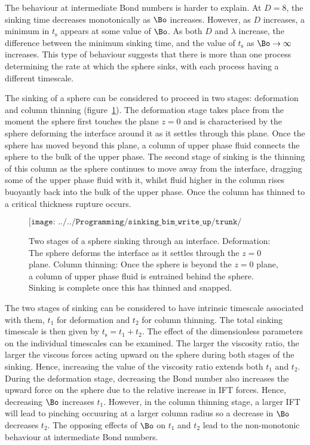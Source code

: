 {The behaviour at intermediate Bond numbers is harder to explain. At $D = 8$, the sinking time decreases monotonically as $\Bo$ increases. However, as $D$ increases, a minimum in $t_{\text{s}}$ appears at some value of $\Bo$. As both $D$ and $\lambda$ increase, the difference between the minimum sinking time, and the value of $t_{\text{s}}$ as $\Bo \to \infty$ increases. This type of behaviour suggests that there is more than one process determining the rate at which the sphere sinks, with each process having a different timescale.

The sinking of a sphere can be considered to proceed in two stages: deformation and column thinning (figure~\ref{fig:sink_stages}). The deformation stage takes place from the moment the sphere first touches the plane $z = 0$ and is characterised by the sphere deforming the interface around it as it settles through this plane. Once the sphere has moved beyond this plane, a column of upper phase fluid connects the sphere to the bulk of the upper phase. The second stage of sinking is the thinning of this column as the sphere continues to move away from the interface, dragging some of the upper phase fluid with it, whilst fluid higher in the column rises buoyantly back into the bulk of the upper phase. Once the column has thinned to a critical thickness rupture occurs. 

\begin{figure}
  $$\texttt{[image: ../../Programming/sinking\_bim\_write\_up/trunk/sink\_stages.png]}$$
  \caption{Two stages of a sphere sinking through an interface. Deformation: The sphere deforms the interface as it settles through the $z = 0$ plane. Column thinning: Once the sphere is beyond the $z = 0$ plane, a column of upper phase fluid is entrained behind the sphere. Sinking is complete once this has thinned and snapped. \label{fig:sink_stages}}
\end{figure}

The two stages of sinking can be considered to have intrinsic timescale associated with them, $t_{1}$ for deformation and $t_{2}$ for column thinning. The total sinking timescale is then given by $t_{\text{s}} = t_{1} + t_{2}$. The effect of the dimensionless parameters on the individual timescales can be examined. The larger the viscosity ratio, the larger the viscous forces acting upward on the sphere during both stages of the sinking. Hence, increasing the value of the viscosity ratio extends both $t_{1}$ and $t_{2}$. During the deformation stage, decreasing the Bond number also increases the upward force on the sphere due to the relative increase in IFT forces. Hence, decreasing $\Bo$ increases $t_{1}$. However, in the column thinning stage, a larger IFT will lead to pinching occuuring at a larger column radius so a decrease in $\Bo$ decreases $t_{2}$. The opposing effects of $\Bo$ on $t_{1}$ and $t_{2}$ lead to the non-monotonic behaviour at intermediate Bond numbers.

}
